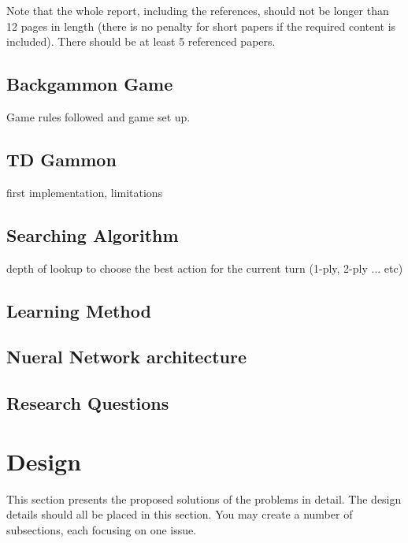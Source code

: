 \documentclass[12pt,a4paper]{article}
\begin{document}
Note that the whole report, including the references, should not be longer than 12 pages in length (there is no penalty for short papers if the required content is included). There should be at least 5 referenced papers.

\subsection{Backgammon Game}
Game rules followed and game set up.

\subsection{TD Gammon}
first implementation, limitations

\subsection{Searching Algorithm}
depth of lookup to choose the best action for the current turn (1-ply, 2-ply ... etc)

\subsection{Learning Method}

\subsection{Nueral Network architecture}

\subsection{Research Questions}

\section{Design}

This section presents the proposed solutions of the problems in detail. The design details should all be placed in this section. You may create a number of subsections, each focusing on one issue.
\end{document}
